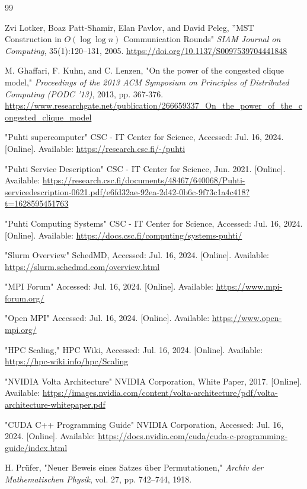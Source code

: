 \documentclass[english, 12pt, a4paper, elec, utf8, a-2b, online]{aaltothesis}
\begin{document}
\begin{thebibliography}{99}

	 Zvi Lotker, Boaz Patt-Shamir, Elan Pavlov, and David Peleg, ”MST Construction in $O(\log{\log{n}})$ Communication Rounds"
	\textit{SIAM Journal on Computing}, 35(1):120–131, 2005.
	\url{https://doi.org/10.1137/S0097539704441848}

	 M. Ghaffari, F. Kuhn, and C. Lenzen, "On the power of the congested clique model," 
	\textit{Proceedings of the 2013 ACM Symposium on Principles of Distributed Computing (PODC '13)}, 2013, pp. 367-376.
	\url{https://www.researchgate.net/publication/266659337_On_the_power_of_the_congested_clique_model}

	 "Puhti supercomputer" CSC - IT Center for Science, Accessed: Jul. 16, 2024. [Online]. Available: \url{https://research.csc.fi/-/puhti}

	 "Puhti Service Description" CSC - IT Center for Science, Jun. 2021. [Online]. Available: \url{https://research.csc.fi/documents/48467/640068/Puhti-servicedescription-0621.pdf/e6fd32ae-92ea-2d42-0b6c-9f73c1a4c418?t=1628595451763}

	 "Puhti Computing Systems" CSC - IT Center for Science, Accessed: Jul. 16, 2024. [Online]. Available: \url{https://docs.csc.fi/computing/systems-puhti/}

	 "Slurm Overview" SchedMD, Accessed: Jul. 16, 2024. [Online]. Available: \url{https://slurm.schedmd.com/overview.html}

	 "MPI Forum" Accessed: Jul. 16, 2024. [Online]. Available: \url{https://www.mpi-forum.org/}

	 "Open MPI" Accessed: Jul. 16, 2024. [Online]. Available: \url{https://www.open-mpi.org/}

	 "HPC Scaling," HPC Wiki, Accessed: Jul. 16, 2024. [Online]. Available: \url{https://hpc-wiki.info/hpc/Scaling}

	 "NVIDIA Volta Architecture" NVIDIA Corporation, White Paper, 2017. [Online]. Available: \url{https://images.nvidia.com/content/volta-architecture/pdf/volta-architecture-whitepaper.pdf}

	 "CUDA C++ Programming Guide" NVIDIA Corporation, Accessed: Jul. 16, 2024. [Online]. Available: \url{https://docs.nvidia.com/cuda/cuda-c-programming-guide/index.html}

	 H. Prüfer, "Neuer Beweis eines Satzes über Permutationen," \textit{Archiv der Mathematischen Physik}, vol. 27, pp. 742--744, 1918.


\end{thebibliography}
\end{document}
